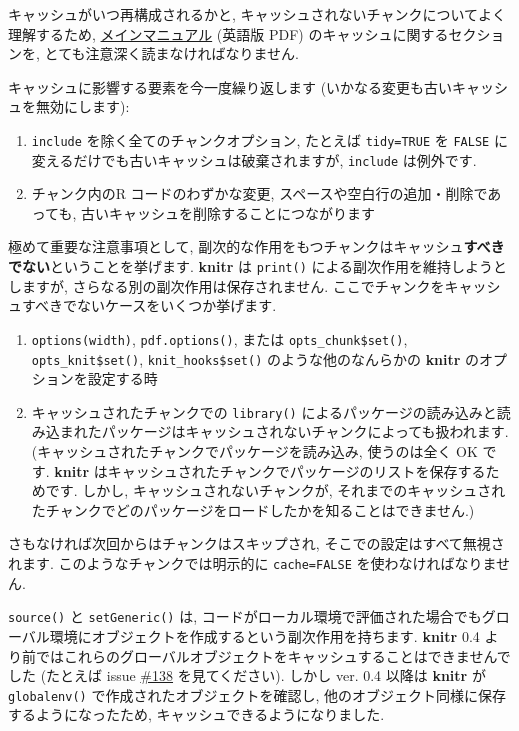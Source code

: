 \documentclass[
  lualatex,ja=standard,jafont=noto-otf]{bxjsreport}
\providecommand{\tightlist}{%
  \setlength{\itemsep}{0pt}\setlength{\parskip}{0pt}}
\begin{document}
キャッシュがいつ再構成されるかと,
キャッシュされないチャンクについてよく理解するため,
\href{https://github.com/yihui/knitr/releases/download/doc/knitr-manual.pdf}{メインマニュアル}
(英語版 PDF) のキャッシュに関するセクションを,
とても注意深く読まなければなりません.

キャッシュに影響する要素を今一度繰り返します
(いかなる変更も古いキャッシュを無効にします):

\begin{enumerate}
\def\labelenumi{\arabic{enumi}.}
\tightlist
\item
  \texttt{include} を除く全てのチャンクオプション, たとえば
  \texttt{tidy=TRUE} を \texttt{FALSE}
  に変えるだけでも古いキャッシュは破棄されますが, \texttt{include}
  は例外です.
\item
  チャンク内のR コードのわずかな変更,
  スペースや空白行の追加・削除であっても,
  古いキャッシュを削除することにつながります
\end{enumerate}

極めて重要な注意事項として,
副次的な作用をもつチャンクはキャッシュ\textbf{すべきでない}ということを挙げます.
\textbf{knitr} は \texttt{print()} による副次作用を維持しようとしますが,
さらなる別の副次作用は保存されません.
ここでチャンクをキャッシュすべきでないケースをいくつか挙げます.

\begin{enumerate}
\def\labelenumi{\arabic{enumi}.}
\tightlist
\item
  \texttt{options(\textquotesingle{}width\textquotesingle{})},
  \texttt{pdf.options()}, または \texttt{opts\_chunk\$set()},
  \texttt{opts\_knit\$set()}, \texttt{knit\_hooks\$set()}
  のような他のなんらかの \textbf{knitr} のオプションを設定する時
\item
  キャッシュされたチャンクでの \texttt{library()}
  によるパッケージの読み込みと読み込まれたパッケージはキャッシュされないチャンクによっても扱われます.
  (キャッシュされたチャンクでパッケージを読み込み, 使うのは全く OK です.
  \textbf{knitr}
  はキャッシュされたチャンクでパッケージのリストを保存するためです.
  しかし, キャッシュされないチャンクが,
  それまでのキャッシュされたチャンクでどのパッケージをロードしたかを知ることはできません.)
\end{enumerate}

さもなければ次回からはチャンクはスキップされ,
そこでの設定はすべて無視されます. このようなチャンクでは明示的に
\texttt{cache=FALSE} を使わなければなりません.

\texttt{source()} と \texttt{setGeneric()} は,
コードがローカル環境で評価された場合でもグローバル環境にオブジェクトを作成するという副次作用を持ちます.
\textbf{knitr} 0.4
より前ではこれらのグローバルオブジェクトをキャッシュすることはできませんでした
(たとえば issue \href{https://github.com/yihui/knitr/issues/138}{\#138}
を見てください). しかし ver. 0.4 以降は \textbf{knitr} が
\texttt{globalenv()} で作成されたオブジェクトを確認し,
他のオブジェクト同様に保存するようになったため,
キャッシュできるようになりました.
\end{document}
